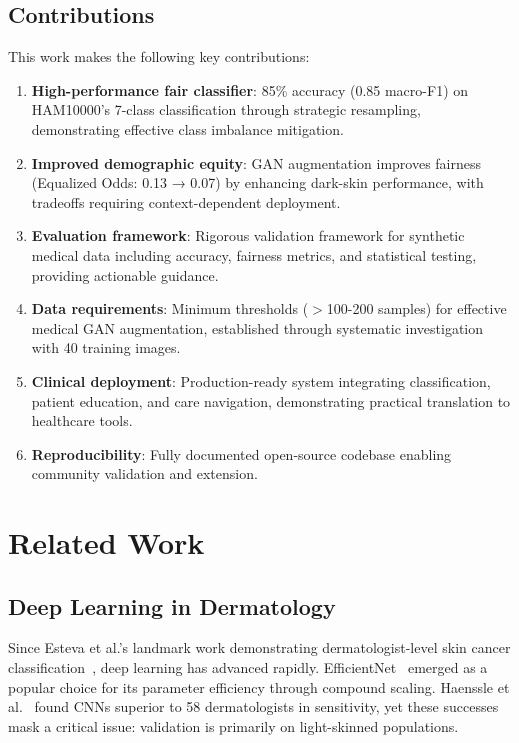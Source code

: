 \documentclass[10pt, twocolumn, letterpaper]{article}
\begin{document}
\subsection{Contributions}
This work makes the following key contributions:
\begin{enumerate}[leftmargin=*, itemsep=2pt]
    \item \textbf{High-performance fair classifier}: 85\% accuracy (0.85 macro-F1) on HAM10000's 7-class classification through strategic resampling, demonstrating effective class imbalance mitigation.
    \item \textbf{Improved demographic equity}: GAN augmentation improves fairness (Equalized Odds: 0.13 → 0.07) by enhancing dark-skin performance, with tradeoffs requiring context-dependent deployment.
    \item \textbf{Evaluation framework}: Rigorous validation framework for synthetic medical data including accuracy, fairness metrics, and statistical testing, providing actionable guidance.
    \item \textbf{Data requirements}: Minimum thresholds ($>$100-200 samples) for effective medical GAN augmentation, established through systematic investigation with 40 training images.
    \item \textbf{Clinical deployment}: Production-ready system integrating classification, patient education, and care navigation, demonstrating practical translation to healthcare tools.
    \item \textbf{Reproducibility}: Fully documented open-source codebase enabling community validation and extension.
\end{enumerate}

\section{Related Work}

\subsection{Deep Learning in Dermatology}
Since Esteva et al.'s landmark work demonstrating dermatologist-level skin cancer classification~\cite{esteva2017}, deep learning has advanced rapidly. EfficientNet~\cite{tan2019} emerged as a popular choice for its parameter efficiency through compound scaling. Haenssle et al.~\cite{haenssle2018} found CNNs superior to 58 dermatologists in sensitivity, yet these successes mask a critical issue: validation is primarily on light-skinned populations.
\end{document}
